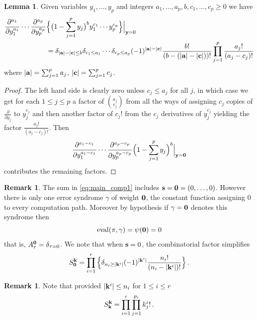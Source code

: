 \documentclass[english,letter paper,12pt,reqno]{article}
\theoremstyle{definition}
\newtheorem{lemma}[theorem]{Lemma}
\newtheorem{remark}[theorem]{Remark}
\begin{document}
\begin{lemma}\label{comin_deriv_pair} Given variables $y_1,\ldots,y_p$ and integers $a_1, \ldots, a_p, b, c_1, \ldots, c_p \ge 0$ we have
\begin{align*}
\frac{\partial^{a_1}}{\partial y_1^{a_1}} \cdots \frac{\partial^{a_p}}{\partial y_p^{a_p}} &\Big\{ \big( 1 - \sum_{j=1}^p y_j \big)^b y_1^{c_1} \cdots y_p^{c_p} \Big\}\Bigr|_{\bold{y} = 0}\\
&= \delta_{|\bold{a}| - |\bold{c}| \le b} \delta_{c_1 \le a_1} \cdots \delta_{c_p \le a_p} (-1)^{|\bold{a}| - |\bold{c}|} \frac{b!}{(b - (|\bold{a}| - |\bold{c}|))!} \prod_{j=1}^p \frac{a_j!}{(a_j-c_j)!}
\end{align*}
where $|\bold{a}| = \sum_{j=1}^p a_j$, $|\bold{c}| = \sum_{j=1}^p c_j$.
\end{lemma}
\begin{proof}
The left hand side is clearly zero unless $c_j \le a_j$ for all $j$, in which case we get for each $1 \le j \le p$ a factor of $\binom{a_j}{c_j}$ from all the ways of assigning $c_j$ copies of $\frac{\partial}{\partial y_j}$ to $y_j^{c_j}$ and then another factor of $c_j!$ from the $c_j$ derivatives of $y_j^{c_j}$ yielding the factor $\frac{a_j!}{(a_j-c_j)!}$. Then
\[
\frac{\partial^{a_1-c_1}}{\partial y_1^{a_1-c_1}} \cdots \frac{\partial^{a_p-c_p}}{\partial y_p^{a_p-c_p}}\Big( 1 - \sum_{j=1}^p y_j \Big)^b\Bigr|_{\bold{y} = \bold{0}}
\]
contributes the remaining factors.
\end{proof}

\begin{remark}\label{remark:S_factor_zero}
The sum in \eqref{eq:main_comp1} includes $\bold{s} = \bold{0} = (0,\ldots,0)$. However there is only one error syndrome $\gamma$ of weight $\bold{0}$, the constant function assigning $0$ to every computation path. Moreover by hypothesis if $\gamma = \bold{0}$ denotes this syndrome then
\[
\operatorname{eval}(\pi, \gamma) = \psi(\bold{0}) = 0
\]
that is, $A^{\bold{0}}_\tau = \delta_{\tau=0}$. We note that when $\bold{s} = 0$, the combinatorial factor simplifies
\[
S^{\bold{k}}_{\bold{0}} = \prod_{i=1}^r \Big\{ \delta_{n_i \ge |\bold{k}^i|} (-1)^{|\bold{k}^i|} \frac{n_i!}{(n_i-|\bold{k}^i|)!} \Big\}\,.
\]
\end{remark}

\begin{remark}\label{remark:skk}
Note that provided $|\bold{k}^i| \le n_i$ for $1 \le i \le r$
\[
S^{\bold{k}}_{\bold{k}} = \prod_{i=1}^r \prod_{j=1}^{p_i} k^i_j!\,.
\]
\end{remark}
\end{document}
